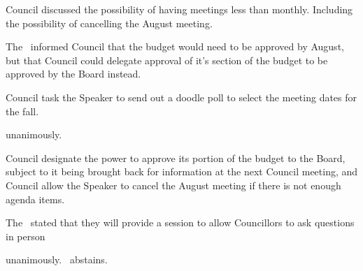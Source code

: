 \begin{information}
    Council discussed the possibility of having meetings less than monthly. 
    Including the possibility of cancelling the August meeting. 

    The \vpof\ informed Council that the budget would need to be approved by 
    August, but that Council could delegate approval of it's section of the
    budget to be approved by the Board instead. 

\end{information}

\begin{motion}
    \birt Council task the Speaker to send out a doodle poll to select the 
    meeting dates for the fall. 
    \movers{\brian}{\jill} 

    \carries unanimously. 
\end{motion}

\begin{motion}
    \birt Council designate the power to approve its portion of the budget to
    the Board, subject to it being brought back for information at the next
    Council meeting, and
    \bifrt Council allow the Speaker to cancel the August meeting if there
    is not enough agenda items.
    \movers{\brian}{\tomson}

    The \vpof\ stated that they will provide a session to allow Councillors to 
    ask questions in person

    \carries unanimously. \jason\ abstains.
\end{motion}

